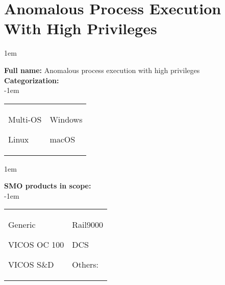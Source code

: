 
%
%

\section{Anomalous Process Execution With High Privileges}
\label{15062}

\openup 1em

\textbf{Full name:} Anomalous process execution with high privileges\hrulefill \\
{\bf Categorization:} \\

\openup -1em
\vspace{-3em}

\begin{tabular}{p{}p{}}

\begin{todolist}
  	\item Multi-OS
	\item Linux
\end{todolist}
&
\begin{todolist}
	\item[\done] Windows
	\item macOS
\end{todolist}

\end{tabular}

\openup 1em

{\bf SMO products in scope:} \\

\openup -1em
\vspace{-3em}

\begin{tabular}{p{}p{}}

\begin{todolist}
  \item[\done] Generic
  \item[\done] VICOS OC 100
  \item[\done] VICOS S\&D
\end{todolist}
&
\begin{todolist}
  \item Rail9000
  \item DCS
  \item Others: \hrulefill
\end{todolist}

\end{tabular}

